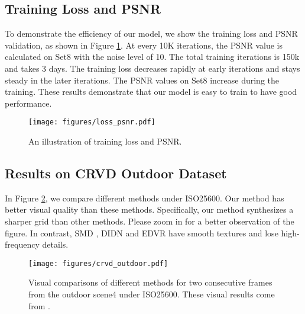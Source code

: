 \documentclass[10pt,twocolumn,letterpaper]{article}
\newlength \g
\begin{document}
\subsection{Training Loss and PSNR}
To demonstrate the efficiency of our model, we show the training loss and PSNR validation, as shown in Figure \ref{fig:loss_psnr}.
At every 10K iterations, the PSNR value is calculated on Set8 with the noise level of 10. 
The total training iterations is 150k and takes 3 days.
The training loss decreases rapidly at early iterations and stays steady in the later iterations.
The PSNR values on Set8 increase during the training.
These results demonstrate that our model is easy to train to have good performance.

\begin{figure}[h]
    \begin{center}
\vspace{-4mm}
    \texttt{[image: figures/loss\_psnr.pdf]}
    \end{center}
    \vspace{-5mm}
    \caption{An illustration of training loss and PSNR.}
    \label{fig:loss_psnr}
    \vspace{-0.5cm}
\end{figure}



\subsection{Results on CRVD Outdoor Dataset}
In Figure \ref{fig:crvd_outdoor}, we compare different methods under ISO25600.
Our method has better visual quality than these methods.
Specifically, our method synthesizes a sharper grid than other methods. Please zoom in for a better observation of the figure.
In contrast, SMD \cite{chen2019smd}, DIDN \cite{yu2019didn} and EDVR \cite{wang2019edvr} have smooth textures and lose high-frequency details.

\begin{figure}[h]
    \begin{center}
\vspace{-3.5mm}
    \texttt{[image: figures/crvd\_outdoor.pdf]}
    \end{center}
    \vspace{-3mm}
    \caption{Visual comparisons of different methods for two consecutive frames from the outdoor scene4 under ISO25600. These visual results come from \cite{yue2020rvidenet}.} \label{fig:crvd_outdoor}
    \vspace{-0.3cm}
\end{figure}
\end{document}
